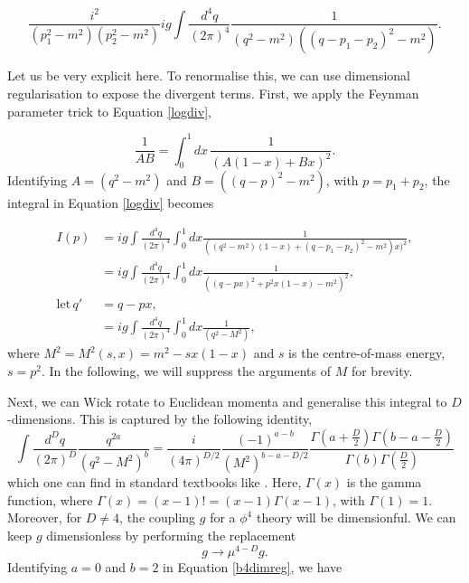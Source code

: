 \documentclass{article}
\begin{document}
\begin{equation}
    \frac{i^2}{(p_1^2-m^2)(p_2^2-m^2)}ig\int \frac{d^4q}{(2\pi)^4} \frac{1}{(q^2-m^2)((q-p_1-p_2)^2 - m^2)}.
    \label{logdiv}
\end{equation}

Let us be very explicit here. To renormalise this, we can use dimensional regularisation to expose the divergent terms. First, we apply the Feynman parameter trick to Equation \ref{logdiv},

\begin{equation}
    \frac{1}{AB} = \int_0^1 dx \, \frac{1}{(A(1-x) + Bx)^2}.
\label{Feynparam trick}
\end{equation}
Identifying $A=(q^2-m^2)$ and $B=((q-p)^2-m^2)$, with $p=p_1+p_2$, the integral in Equation \ref{logdiv} becomes

\begin{equation}
\begin{split}
    I(p) &= ig\int \frac{d^4q}{(2\pi)^4}\int^1_0 dx \frac{1}{((q^2-m^2)(1-x) +(q-p_1-p_2)^2 - m^2)x)^2},\\
    &= ig\int \frac{d^4q}{(2\pi)^4}\int^1_0 dx \frac{1}{((q-px)^2 + p^2x(1-x) - m^2 )^2},\\
    \mathrm{let}\, q'&= q-px,\\
    &= ig\int \frac{d^4q}{(2\pi)^4}\int^1_0 dx \frac{1}{(q^2 -M^2)},
    \label{b4dimreg}
\end{split}
\end{equation}
where $M^2=M^2(s,x)=m^2-sx(1-x)$ and $s$ is the centre-of-mass energy, $s=p^2$. In the following, we will suppress the arguments of $M$ for brevity.

Next, we can Wick rotate to Euclidean momenta and generalise this integral to $D$-dimensions. This is captured by the following identity, 
\begin{equation}
    \int\frac{d^Dq}{(2\pi)^D} \frac{q^{2a}}{(q^2-M^2)^b}=\frac{i}{(4\pi)^{D/2}}\frac{(-1)^{a-b}}{(M^2)^{b-a-D/2}} \frac{\Gamma(a+\frac{D}{2})\Gamma(b-a-\frac{D}{2})}{\Gamma(b)\Gamma(\frac{D}{2})}
\end{equation}
which one can find in standard textbooks like \cite{schwartz}. Here, $\Gamma(x)$ is the gamma function, where $\Gamma(x) = (x-1)! = (x-1)\Gamma(x-1)$, with $\Gamma(1)=1$. Moreover, for $D\neq 4$, the coupling $g$ for a $\phi^4$ theory will be dimensionful. We can keep $g$ dimensionless by performing the replacement
\begin{equation}
    g \rightarrow \mu^{4-D}g.
\end{equation}
Identifying $a=0$ and $b=2$ in Equation \ref{b4dimreg}, we have 
\end{document}
